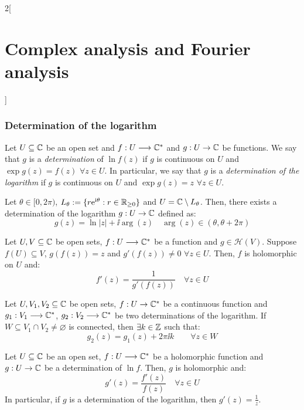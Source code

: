\documentclass[../../../main.tex]{subfiles}
\begin{document}
\begin{multicols}{2}[\section{Complex analysis and Fourier analysis}]
  \subsubsection{Determination of the logarithm}
  \begin{definition}
    Let $U\subseteq\mathbb{C}$ be an open set and $f:U\longrightarrow\mathbb{C}^*$ and $g:U\rightarrow\mathbb{C}$ be functions. We say that $g$ is a \emph{determination} of $\ln f(z)$ if $g$ is continuous on $U$ and $\exp{g(z)}=f(z)$ $\forall z\in U$. In particular, we say that $g$ is a \emph{determination of the logarithm} if $g$ is continuous on $U$ and $\exp{g(z)}=z$ $\forall z\in U$.
  \end{definition}
  \begin{proposition}
    Let $\theta\in[0,2\pi)$, $L_\theta:=\{r\mathrm{e}^{\mathrm{i}\theta}:r\in\mathbb{R}_{\geq 0}\}$ and $U=\mathbb{C}\setminus L_\theta$. Then, there exists a determination of the logarithm $g:U\rightarrow\mathbb{C}$ defined as:
    $$g(z)=\ln |z|+\ii\arg(z)\quad\arg(z)\in(\theta,\theta+2\pi)$$
  \end{proposition}
  \begin{theorem}
    Let $U,V\subseteq\mathbb{C}$ be open sets, $f:U\longrightarrow\mathbb{C}^*$ be a function and $g\in\mathcal{H}(V)$. Suppose $f(U)\subseteq V$, $g(f(z))=z$ and $g'(f(z))\ne 0$ $\forall z\in U$. Then, $f$ is holomorphic on $U$ and: $$f'(z)=\frac{1}{g'(f(z))}\quad\forall z\in U$$
  \end{theorem}
  \begin{proposition}
    Let $U,V_1,V_2\subseteq\mathbb{C}$ be open sets, $f:U\rightarrow\mathbb{C}^*$ be a continuous function and $g_1:V_1\longrightarrow\mathbb{C}^*$, $g_2:V_2\longrightarrow\mathbb{C}^*$ be two determinations of the logarithm. If $W\subseteq V_1\cap V_2\ne\varnothing$ is connected, then $\exists k\in\mathbb{Z}$ such that: $$g_2(z)=g_1(z)+2\pi \ii k\qquad\forall z\in W$$
  \end{proposition}
  \begin{corollary}
    Let $U\subseteq\mathbb{C}$ be an open set, $f:U\longrightarrow\mathbb{C}^*$ be a holomorphic function and $g:U\rightarrow\mathbb{C}$ be a determination of $\ln f$. Then, $g$ is holomorphic and: $$g'(z)=\frac{f'(z)}{f(z)}\quad \forall z\in U$$
    In particular, if $g$ is a determination of the logarithm, then $g'(z)=\frac{1}{z}$.
  \end{corollary}

\end{multicols}
\end{document}
